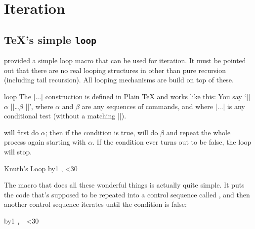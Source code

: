 \chapter{Iteration}

\section{\TeX's simple \protect\texttt{loop}}

 provided a simple loop macro that can be used for iteration. It must be pointed out that there are no real looping structures in \tex other than pure recursion (including tail recursion). All looping mechanisms are build on top of these.

\begin{docCmd}{loop}{}
The |\loop...\repeat| construction is defined in Plain TeX and works like this:
You say `|\loop| $\alpha$ |\if|\dots $\beta$  |\repeat|', where $\alpha$ and $\beta$ are any sequences of
commands, and where |\if...| is any conditional test (without a matching |\fi|). 
\end{docCmd}

\tex
will first do $\alpha$; then if the condition is true, \tex will do $\beta$ and repeat the whole process
again starting with $\alpha$. If the condition ever turns out to be false, the loop will stop.

\begin{texexample}{Knuth's Loop}{}
\bgroup
\newcount\n
{}
\loop
   \advance\n by1
     \number\n,   
   \ifnum\n<30
\repeat
\egroup
\end{texexample}




The \cmd{\loop} macro that does all these wonderful things is actually quite simple.
It puts the code that's supposed to be repeated into a control sequence called
\cmd{\body}, and then another control sequence iterates until the condition is false:

\begin{teX}
\def\loop#1\repeat{\def\body{#1}\iterate}
\def\iterate{\body\let\next=\iterate\else\let\next=\relax\fi\next}
\end{teX}


\noindent\colorbox{gray!10}{\parbox{10cm}{\noindent
\newcount\n
{}
\loop
   \advance\n by1
     \texttt{\number\n, } 
   \ifnum\n<30
\repeat
}}
\bigskip

